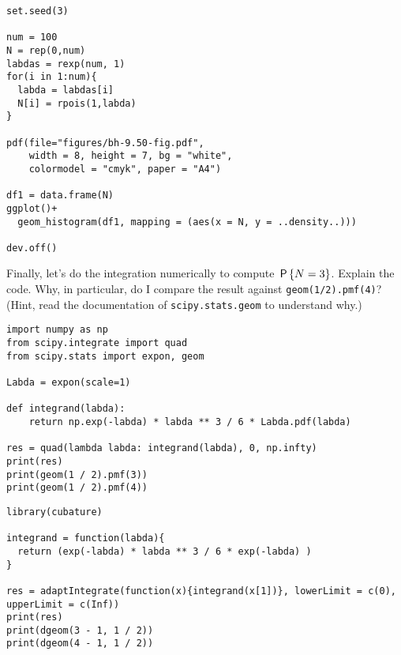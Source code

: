 \begin{verbatim}
set.seed(3)

num = 100
N = rep(0,num)
labdas = rexp(num, 1)
for(i in 1:num){
  labda = labdas[i]
  N[i] = rpois(1,labda)
}

pdf(file="figures/bh-9.50-fig.pdf",
    width = 8, height = 7, bg = "white",          
    colormodel = "cmyk", paper = "A4")

df1 = data.frame(N)
ggplot()+
  geom_histogram(df1, mapping = (aes(x = N, y = ..density..)))

dev.off()
\end{verbatim}

\begin{exercise}
Finally, let's do the integration numerically to compute $\P{N=3}$. Explain the code. Why, in particular, do I compare the result against \texttt{geom(1/2).pmf(4)}? (Hint, read the documentation of \texttt{scipy.stats.geom}  to understand why.)
\begin{verbatim}
import numpy as np
from scipy.integrate import quad
from scipy.stats import expon, geom

Labda = expon(scale=1)

def integrand(labda):
    return np.exp(-labda) * labda ** 3 / 6 * Labda.pdf(labda)

res = quad(lambda labda: integrand(labda), 0, np.infty)
print(res)
print(geom(1 / 2).pmf(3))
print(geom(1 / 2).pmf(4))
\end{verbatim}

\begin{verbatim}
library(cubature)  

integrand = function(labda){
  return (exp(-labda) * labda ** 3 / 6 * exp(-labda) )
}

res = adaptIntegrate(function(x){integrand(x[1])}, lowerLimit = c(0), upperLimit = c(Inf))
print(res)
print(dgeom(3 - 1, 1 / 2))
print(dgeom(4 - 1, 1 / 2))
\end{verbatim}

\end{exercise}





